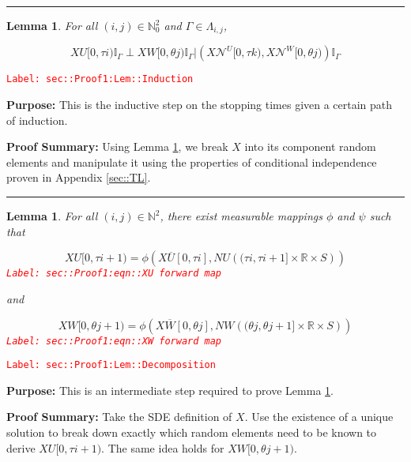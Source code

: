 \documentclass[12pt]{article}
\newcommand{\mb}{\mathbb}
\newcommand{\mc}{\mathcal}
\newcommand{\ov}{\overline}
\newcommand{\tr}{\textcolor{red}}
\newcommand{\labe}[1]{\tr{\texttt{Label: #1}}}
\newcommand{\purpose}{\textbf{Purpose: }}
\newcommand{\pfsum}{\textbf{Proof Summary: }}
\newcommand{\lin}{\rule{\linewidth}{0.4 pt}}
\renewcommand{\U}{U}							%
\newcommand{\UU}{W}								%
\renewcommand{\S}{S}							%
\newcommand{\X}{X}								%
\newcommand{\neigh}{\mc{N}}						%
\newcommand{\vind}[1]{^{#1}}					%
\newcommand{\cl}{\ov}							%
\newcommand{\poiss}{N}							%
\newcommand{\rt}{\tau}							%
\newcommand{\rtt}{\theta}						%
\renewcommand{\it}{k}							%
\newcommand{\apath}{\Gamma}						%
\newcommand{\pathset}[2]{\Lambda_{#1,#2}}		%
\newtheorem{lem}[thms]{Lemma}
\begin{document}
\lin

\begin{lem}
For all \((i,j)\in \mb{N}_0^2\) and \(\apath{} \in \pathset{i}{j}\),

\[\X{\U}{[0,\rt{i})}\mb{I}_{\apath{}}\perp \X{\UU}{[0,\rtt{j})}\mb{I}_{\apath{}}|\left(\X{\neigh\vind{\U}}{[0,\rt{\it})},\X{\neigh\vind{\UU}}{[0,\rtt{j})}\right)\mb{I}_{\apath{}}\]
\label{sec::Proof1:Lem::Induction}
\end{lem}
\labe{sec::Proof1:Lem::Induction}

\purpose This is the inductive step on the stopping times given a certain path of induction.

\pfsum Using Lemma \ref{sec::Proof1:Lem::Decomposition}, we break \(\X{}{}\) into its component random elements and manipulate it using the properties of conditional independence proven in Appendix \ref{sec::TL}.

\lin

\begin{lem}
For all \((i,j)\in \mb{N}^2\), there exist measurable mappings \(\phi\) and \(\psi\) such that 

\begin{equation}
\X{\U}{[0,\rt{i+1})} = \phi\left(\X{\cl{\U}}{[0,\rt{i}]}, \poiss{\U}\left((\rt{i}, \rt{i+1}]\times \mb{R}\times \S\right)\right)
\label{sec::Proof1:eqn::XU forward map}
\end{equation}
\labe{sec::Proof1:eqn::XU forward map}

and

\begin{equation}
\X{\UU}{[0,\rtt{j+1})} = \phi\left(\X{\cl{\UU}}{[0,\rtt{j}]}, \poiss{\UU}\left((\rtt{j}, \rtt{j+1}]\times \mb{R}\times \S\right)\right)
\label{sec::Proof1:eqn::XW forward map}
\end{equation}
\labe{sec::Proof1:eqn::XW forward map}

\label{sec::Proof1:Lem::Decomposition}
\end{lem}
\labe{sec::Proof1:Lem::Decomposition}

\purpose This is an intermediate step required to prove Lemma \ref{sec::Proof1:Lem::Induction}.

\pfsum Take the SDE definition of \(\X{}{}\). Use the existence of a unique solution to break down exactly which random elements need to be known to derive \(\X{\U}{[0,\rt{i+1})}\). The same idea holds for \(\X{\UU}{[0,\rtt{j+1})}\).
\end{document}
